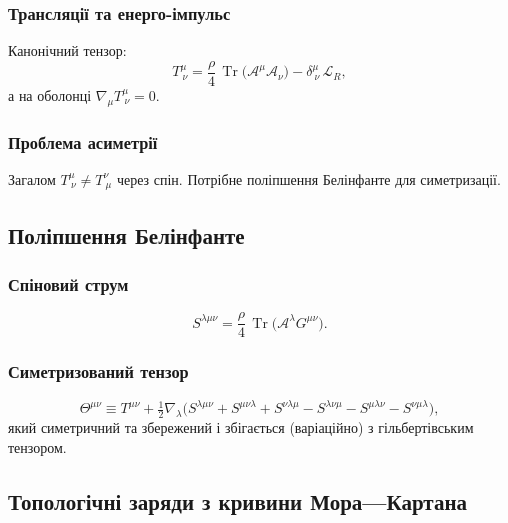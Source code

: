 \documentclass[11pt,a4paper]{article}
\numberwithin{equation}{section}
\theoremstyle{plain}
\theoremstyle{definition}
\theoremstyle{remark}
\DeclareMathOperator{\Tr}{Tr}
\begin{document}
\subsubsection{Трансляції та енерго-імпульс}

Канонічний тензор:
\begin{equation}
T^\mu_{\ \nu} = \frac{\rho}{4}\,\Tr\!\big(\mathcal{A}^\mu\mathcal{A}_\nu\big) - \delta^\mu_{\ \nu}\,\mathcal{L}_R,
\label{eq:canonicalT}
\end{equation}
а на оболонці $\nabla_\mu T^\mu_{\ \nu}=0$.

\subsubsection{Проблема асиметрії}

Загалом $T^\mu_{\ \nu}\neq T^\nu_{\ \mu}$ через спін. Потрібне поліпшення Белінфанте для симетризації.

\subsection{Поліпшення Белінфанте}

\subsubsection{Спіновий струм}

\begin{equation}
S^{\lambda\mu\nu} = \frac{\rho}{4}\,\Tr\!\big(\mathcal{A}^\lambda G^{\mu\nu}\big).
\label{eq:spin-tensor}
\end{equation}

\subsubsection{Симетризований тензор}

\begin{equation}
\Theta^{\mu\nu} \equiv T^{\mu\nu} + \tfrac{1}{2}\nabla_\lambda\!\big( S^{\lambda\mu\nu} + S^{\mu\nu\lambda} + S^{\nu\lambda\mu} - S^{\lambda\nu\mu} - S^{\mu\lambda\nu} - S^{\nu\mu\lambda} \big),
\label{eq:belinfante-def}
\end{equation}
який симетричний та збережений і збігається (варіаційно) з гільбертівським тензором.

\subsection{Топологічні заряди з кривини Мора—Картана}
\end{document}
